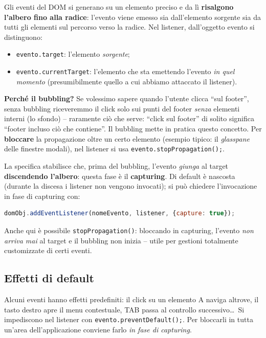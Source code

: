 \begin{definizione}[Bubbling]
Gli eventi del DOM si generano su un elemento preciso e da l\`i \textbf{risalgono l'albero
fino alla radice}: l'evento viene emesso sia dall'elemento sorgente sia da tutti gli elementi
sul percorso verso la radice. Nel listener, dall'oggetto evento si distinguono:
\begin{itemize}
  \item \texttt{evento.target}: l'elemento \emph{sorgente};
  \item \texttt{evento.currentTarget}: l'elemento che sta emettendo l'evento \emph{in quel
        momento} (presumibilmente quello a cui abbiamo attaccato il listener).
\end{itemize}
\end{definizione}

\textbf{Perch\'e il bubbling?} Se volessimo sapere quando l'utente clicca ``sul footer'',
senza bubbling riceveremmo il click solo sui punti del footer \emph{senza} elementi interni
(lo sfondo) -- raramente ci\`o che serve: ``click sul footer'' di solito significa ``footer
incluso ci\`o che contiene''. Il bubbling mette in pratica questo concetto.
Per \textbf{bloccare} la propagazione oltre un certo elemento (esempio tipico: il
\emph{glasspane} delle finestre modali), nel listener si usa
\texttt{evento.stopPropagation();}.

\begin{definizione}[Capturing]
La specifica stabilisce che, prima del bubbling, l'evento \emph{giunga} al target
\textbf{discendendo l'albero}: questa fase \`e il \textbf{capturing}. Di default \`e nascosta
(durante la discesa i listener non vengono invocati); si pu\`o chiedere l'invocazione in fase
di capturing con:
\begin{lstlisting}[language=JavaScript]
domObj.addEventListener(nomeEvento, listener, {capture: true});
\end{lstlisting}
Anche qui \`e possibile \texttt{stopPropagation()}: bloccando in capturing, l'evento
\emph{non arriva mai} al target e il bubbling non inizia -- utile per gestioni totalmente
customizzate di certi eventi.
\end{definizione}

\subsection{Effetti di default}
Alcuni eventi hanno effetti predefiniti: il click su un elemento A naviga altrove, il tasto
destro apre il menu contestuale, TAB passa al controllo successivo\dots\ Si impediscono nel
listener con \texttt{evento.preventDefault();}. Per bloccarli in tutta un'area
dell'applicazione conviene farlo \emph{in fase di capturing}.
